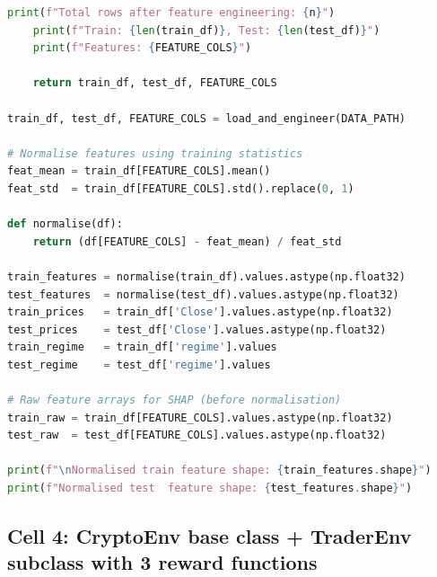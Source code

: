 \documentclass[11pt,a4paper]{article}
\begin{document}
\begin{lstlisting}[language=Python]
    print(f"Total rows after feature engineering: {n}")
    print(f"Train: {len(train_df)}, Test: {len(test_df)}")
    print(f"Features: {FEATURE_COLS}")

    return train_df, test_df, FEATURE_COLS

train_df, test_df, FEATURE_COLS = load_and_engineer(DATA_PATH)

# Normalise features using training statistics
feat_mean = train_df[FEATURE_COLS].mean()
feat_std  = train_df[FEATURE_COLS].std().replace(0, 1)

def normalise(df):
    return (df[FEATURE_COLS] - feat_mean) / feat_std

train_features = normalise(train_df).values.astype(np.float32)
test_features  = normalise(test_df).values.astype(np.float32)
train_prices   = train_df['Close'].values.astype(np.float32)
test_prices    = test_df['Close'].values.astype(np.float32)
train_regime   = train_df['regime'].values
test_regime    = test_df['regime'].values

# Raw feature arrays for SHAP (before normalisation)
train_raw = train_df[FEATURE_COLS].values.astype(np.float32)
test_raw  = test_df[FEATURE_COLS].values.astype(np.float32)

print(f"\nNormalised train feature shape: {train_features.shape}")
print(f"Normalised test  feature shape: {test_features.shape}")
\end{lstlisting}

\subsection*{Cell 4: CryptoEnv base class + TraderEnv subclass with 3 reward functions}
\end{document}
